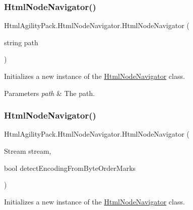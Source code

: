\subsubsection{\texorpdfstring{Html\+Node\+Navigator()}{HtmlNodeNavigator()}\hspace{0.1cm}{\footnotesize\ttfamily [3/11]}}
{\footnotesize\ttfamily Html\+Agility\+Pack.\+Html\+Node\+Navigator.\+Html\+Node\+Navigator (\begin{DoxyParamCaption}\item[{string}]{path }\end{DoxyParamCaption})\hspace{0.3cm}{\ttfamily [inline]}}



Initializes a new instance of the \hyperlink{class_html_agility_pack_1_1_html_node_navigator}{Html\+Node\+Navigator} class. 


\begin{DoxyParams}{Parameters}
{\em path} & The path.\\
\hline
\end{DoxyParams}
\mbox{\label{class_html_agility_pack_1_1_html_node_navigator_a7c91f826d5207f21a16645d029672127}} 
\subsubsection{\texorpdfstring{Html\+Node\+Navigator()}{HtmlNodeNavigator()}\hspace{0.1cm}{\footnotesize\ttfamily [4/11]}}
{\footnotesize\ttfamily Html\+Agility\+Pack.\+Html\+Node\+Navigator.\+Html\+Node\+Navigator (\begin{DoxyParamCaption}\item[{Stream}]{stream,  }\item[{bool}]{detect\+Encoding\+From\+Byte\+Order\+Marks }\end{DoxyParamCaption})\hspace{0.3cm}{\ttfamily [inline]}}



Initializes a new instance of the \hyperlink{class_html_agility_pack_1_1_html_node_navigator}{Html\+Node\+Navigator} class. 


